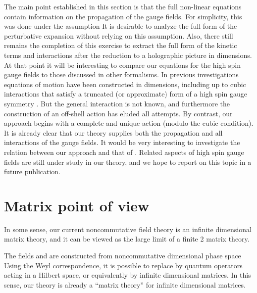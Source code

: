 \documentclass[a4paper,12pt]{article}
\begin{document}
The main point established in this section is that the full non-linear
equations contain information on the propagation of the gauge fields. For
simplicity, this was done under the assumption \coordHE{} It is desirable to analyze the full form of the
perturbative expansion without relying on this assumption. Also, there still
remains the completion of this exercise to extract the full form of the
kinetic terms and interactions after the reduction to a holographic picture
in \coordHE{} dimensions. At that point it will be interesting to compare our
equations for the high spin gauge fields to those discussed in other
formalisms. In previous investigations equations of motion have been
constructed in \coordHE{} dimensions, including up to cubic interactions that
satisfy a truncated (or approximate) form of a high spin gauge symmetry \cite
{vasil}.  But the general interaction is not known, and furthermore the
construction of an off-shell action has eluded all attempts. By contrast,
our approach begins with a complete and unique action (modulo the cubic
condition). It is already clear that our theory supplies both the
propagation and all interactions of the gauge fields. It would be very
interesting to investigate the relation between our approach and that of 
\cite{vasil}. Related aspects of high spin gauge fields are still under
study in our theory, and we hope to report on this topic in a future
publication.

\section{Matrix point of view}

In some sense, our current noncommutative field theory is an infinite
dimensional matrix theory, and it can be viewed as the large \coordHE{} limit of a
finite 2\coordHE{} matrix theory.

The fields \coordHE{} and \coordHE{} are constructed from noncommutative \coordHE{} dimensional
phase space \coordHE{} Using the Weyl
correspondence, it is possible to replace \coordHE{}
by quantum operators acting in a Hilbert space, or equivalently by infinite
dimensional matrices. In this sense, our theory is already a ``matrix
theory'' for infinite dimensional matrices.
\end{document}
